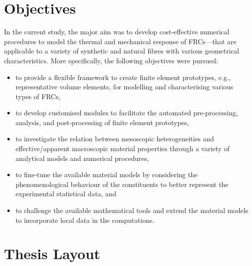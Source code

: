 \section{Objectives}
In the current study, the major aim was to develop cost-effective numerical procedures to model the thermal and mechanical response of FRCs---that are applicable to a variety of synthetic and natural fibres with various geometrical characteristics. More specifically, the following objectives were pursued:
	\begin{itemize}
		\item to provide a flexible framework to create finite element prototypes, e.g., representative volume elements, for modelling and characterising various types of FRCs,
		\item to develop customised modules to facilitate the automated pre-processing, analysis, and post-processing of finite element prototypes,
		\item to investigate the relation between mesoscopic heterogeneities and effective/apparent macroscopic material properties through a variety of analytical models and numerical procedures, 
		\item to fine-tune the available material models by considering the phenomenological behaviour of the constituents to better represent the experimental statistical data, and
		\item to challenge the available mathematical tools and extend the material models to incorporate local data in the computations.
	\end{itemize}
	
	
	
\section{Thesis Layout}
